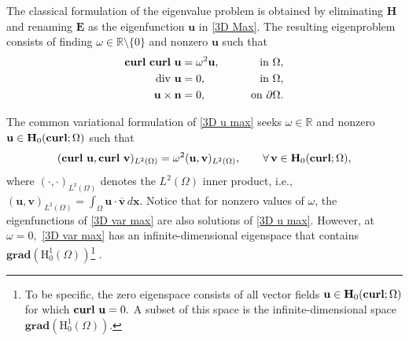 
The classical formulation of the eigenvalue problem is obtained by eliminating $\mathbf{H}$ and renaming $\mathbf{E}$ as the eigenfunction $\mathbf{u}$ in \eqref{3D Max}. The resulting eigenproblem consists of finding $\omega \in \mathbb{R}\setminus\{0\}$ and nonzero  $\mathbf{u}$ such that
\begin{subequations}\label{3D u max}
\begin{align}
    \operatorname{\mathbf{curl}} \, \operatorname{\mathbf{curl}} \,  \mathbf{u} &= \omega^2 \mathbf{u}, \qquad &\text{in } \Omega,\\
    \operatorname{div} \, \mathbf{u} &= 0, \qquad &\text{in }  \Omega, \\
    \mathbf{u} \times \mathbf{n} &= 0, \qquad &\text{on } \partial \Omega. 
\end{align}
\end{subequations}

The common variational formulation of \eqref{3D u max} seeks $\omega \in \mathbb{R}$ and nonzero $\mathbf{u} \in \mathbf{H}_0(\operatorname{\mathbf{curl}}; \Omega)$ such that
\begin{equation} \label{3D var max}
    (\operatorname{\mathbf{curl}} \, \mathbf{u}, \operatorname{\mathbf{curl}} \, \mathbf{v})_{L^2(\Omega)} = \omega^2(\mathbf{u}, \mathbf{v})_{L^2(\Omega)}, \qquad \operatorname{\forall} \mathbf{v} \in \mathbf{H}_0(\operatorname{\mathbf{curl}}; \Omega),
\end{equation}
where $(\cdot, \cdot)_{L^2(\Omega)}$ denotes the $L^2(\Omega)$ inner product, i.e., $(\mathbf{u}, \mathbf{v})_{L^2(\Omega)} = \int_{\Omega} \mathbf{u} \cdot \overline{\mathbf{v}} \, d \mathbf{x}.$
Notice that for nonzero values of $\omega$, the eigenfunctions of \eqref{3D var max} are also solutions of \eqref{3D u max}. However,  at $\omega = 0,$ \eqref{3D var max} has an infinite-dimensional eigenspace that contains $\textbf{grad}(\text{H}_0^1(\Omega))$\footnote{To be specific, the zero eigenspace consists of all vector fields $\mathbf{u} \in \mathbf{H}_0(\operatorname{\mathbf{curl}};\Omega)$ for which $\operatorname{\mathbf{curl}} \, \mathbf{u} = 0.$ A subset of this space is the infinite-dimensional space  $\textbf{grad}(\text{H}_0^1(\Omega))$.} \cite[Section~5]{Boffi}. 






